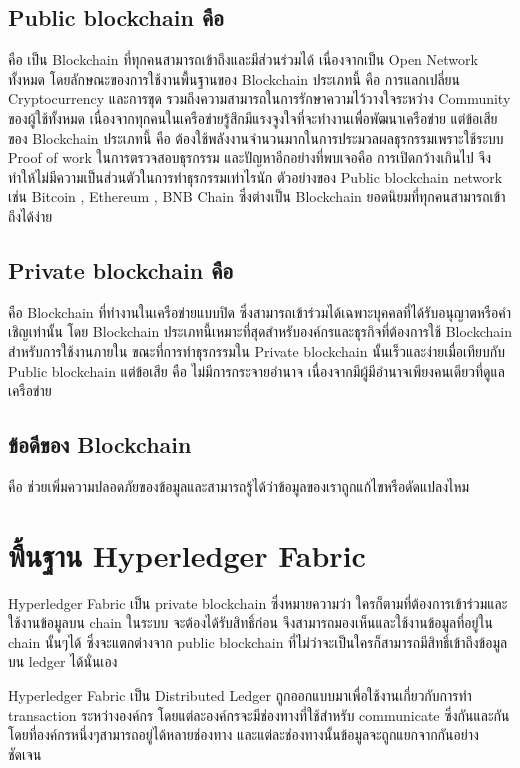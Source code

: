 \subsection{Public blockchain คือ}
\cite{Blockchain_b}
คือ เป็น Blockchain ที่ทุกคนสามารถเข้าถึงและมีส่วนร่วมได้ เนื่องจากเป็น Open Network ทั้งหมด โดยลักษณะของการใช้งานพื้นฐานของ Blockchain ประเภทนี้ คือ การแลกเปลี่ยน Cryptocurrency และการขุด รวมถึงความสามารถในการรักษาความไว้วางใจระหว่าง Community ของผู้ใช้ทั้งหมด 
เนื่องจากทุกคนในเครือข่ายรู้สึกมีแรงจูงใจที่จะทำงานเพื่อพัฒนาเครือข่าย แต่ข้อเสียของ Blockchain ประเภทนี้ คือ ต้องใช้พลังงานจำนวนมากในการประมวลผลธุรกรรมเพราะใช้ระบบ Proof of work ในการตรวจสอบธุรกรรม และปัญหาอีกอย่างที่พบเจอคือ การเปิดกว้างเกินไป จึงทำให้ไม่มีความเป็นส่วนตัวในการทำธุรกรรมเท่าไรนัก
ตัวอย่างของ Public blockchain network เช่น Bitcoin  , Ethereum , BNB Chain ซึ่งต่างเป็น Blockchain ยอดนิยมที่ทุกคนสามารถเข้าถึงได้ง่าย
\subsection{Private blockchain คือ}
\cite{Blockchain_b}
คือ Blockchain ที่ทำงานในเครือข่ายแบบปิด ซึ่งสามารถเข้าร่วมได้เฉพาะบุคคลที่ได้รับอนุญาตหรือคำเชิญเท่านั้น โดย Blockchain ประเภทนี้เหมาะที่สุดสำหรับองค์กรและธุรกิจที่ต้องการใช้ Blockchain สำหรับการใช้งานภายใน 
ขณะที่การทำธุรกรรมใน Private blockchain นั้นเร็วและง่ายเมื่อเทียบกับ Public blockchain แต่ข้อเสีย คือ ไม่มีการกระจายอำนาจ เนื่องจากมีผู้มีอำนาจเพียงคนเดียวที่ดูแลเครือข่าย
\subsection{ข้อดีของ Blockchain}
\cite{Blockchain_a}
คือ ช่วยเพิ่มความปลอดภัยของข้อมูลและสามารถรู้ได้ว่าข้อมูลของเราถูกแก้ไขหรือดัดแปลงไหม

\section{พื้นฐาน Hyperledger Fabric}
\enskip \enskip \enskip \enskip \enskip
\cite{Hyperledger} 
Hyperledger Fabric เป็น private blockchain ซึ่งหมายความว่า ใครก็ตามที่ต้องการเข้าร่วมและใช้งานข้อมูลบน chain ในระบบ จะต้องได้รับสิทธิ์ก่อน จึงสามารถมองเห็นและใช้งานข้อมูลที่อยู่ใน chain นั้นๆได้ ซึ่งจะแตกต่างจาก public blockchain ที่ไม่ว่าจะเป็นใครก็สามารถมีสิทธิ์เข้าถึงข้อมูลบน ledger ได้นั่นเอง

Hyperledger Fabric เป็น Distributed Ledger ถูกออกแบบมาเพื่อใช้งานเกี่ยวกับการทำ transaction ระหว่างองค์กร โดยแต่ละองค์กรจะมีช่องทางที่ใช้สำหรับ communicate ซึ่งกันและกัน โดยที่องค์กรหนึ่งๆสามารถอยู่ได้หลายช่องทาง และแต่ละช่องทางนั้นข้อมูลจะถูกแยกจากกันอย่างชัดเจน

